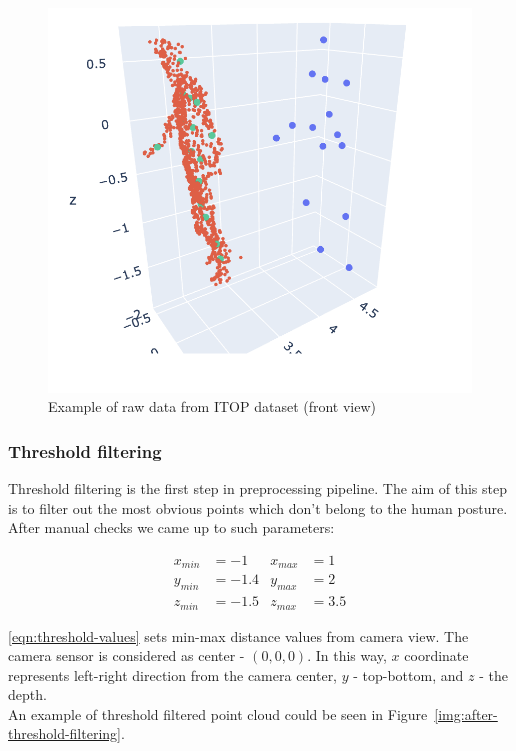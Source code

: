 \begin{figure}[htbp]
    \centerline{\includegraphics[scale=.4]{Figures/template.png}}
    \caption{Example of raw data from ITOP dataset (front view)}
    \label{img:example-of-raw-data}
\end{figure}

\subsubsection{Threshold filtering}
\label{s:threshold-filtering}
Threshold filtering is the first step in preprocessing pipeline. The aim of this step is to filter out the most obvious points which don't belong to the human posture.
After manual checks we came up to such parameters:  

\begin{equation}
    \begin{aligned}
        x_{min} &= -1   &x_{max} &= 1 \\
        y_{min} &= -1.4 &y_{max} &= 2 \\
        z_{min} &= -1.5 &z_{max} &= 3.5
    \end{aligned}
\label{eqn:threshold-values}
\end{equation}

\ref{eqn:threshold-values} sets min-max distance values from camera view. The camera sensor is considered as center - $(0, 0, 0)$. In this way, $x$ coordinate represents left-right direction from the camera center, $y$ - top-bottom, and $z$ - the depth. \\
An example of threshold filtered point cloud could be seen in Figure~\ref{img:after-threshold-filtering}.

